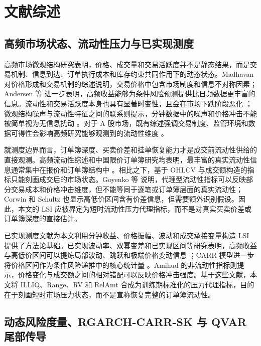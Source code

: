 \section{文献综述}

\subsection{高频市场状态、流动性压力与已实现测度}

高频市场微观结构研究表明，价格、成交量和交易活跃度并不是静态结果，而是交易机制、信息到达、订单执行成本和库存约束共同作用下的动态状态。Madhavan \cite{madhavan2000survey} 对价格形成和交易机制的综述说明，交易价格中包含市场制度和信息不对称因素；Andersen 等 \cite{andersen2003realized} 进一步表明，高频收益能够为条件风险预测提供比日频数据更丰富的信息。流动性和交易活跃度本身也具有显著时变性，且会在市场下跌阶段恶化 \cite{chordia2001liquidity}；微观结构噪声与流动性特征之间的联系则提示，分钟数据中的噪声和价格冲击不能被简单视为无信息扰动 \cite{aitsahalia2009noise}。对于 A 股市场，既有综述强调交易制度、监管环境和数据可得性会影响高频研究能够观测到的流动性维度 \cite{peng2024chinamicrostructure}。

就测度边界而言，订单簿深度、买卖价差和挂单恢复能力才是成交前流动性供给的直接观测。高频流动性综述和中国限价订单簿研究均表明，最丰富的真实流动性信息通常集中在报价和订单簿结构中 \cite{cobandag2022liquidityreview,gu2007bidaskchina}。相比之下，基于 OHLCV 与成交额构造的指标只能刻画成交后的市场状态。Goyenko 等 \cite{goyenko2009liquidity} 说明，代理型流动性指标可以反映部分交易成本和价格冲击维度，但不能等同于逐笔或订单簿层面的真实流动性；Corwin 和 Schultz \cite{corwin2012spread} 也显示高低价区间含有价差信息，但需要额外识别假设。因此，本文的 LSI 应被界定为短时流动性压力代理指标，而不是对真实买卖价差或订单簿深度的直接估计。

已实现测度文献为本文利用分钟收益、价格振幅、波动和成交承接变量构造 LSI 提供了方法论基础。已实现波动率、双幂变差和已实现区间等研究表明，高频收益与高低价区间可以提炼局部波动、跳跃和极端价格变动信息 \cite{andersen2003realized,barndorff2004bipower,martens2007range}；CARR 模型进一步将价格区间作为条件风险递推中的核心统计量 \cite{chou2005carr}。Amihud \cite{amihud2002illiquidity} 的非流动性指标则提示，价格变化与成交额之间的相对错配可以反映价格冲击强度。基于这些文献，本文将 ILLIQ、Range、RV 和 RelAmt 合成为训练期标准化的压力代理指标，目的在于刻画短时市场压力状态，而不是宣称恢复完整的订单簿流动性。

\subsection{动态风险度量、RGARCH-CARR-SK 与 QVAR 尾部传导}

